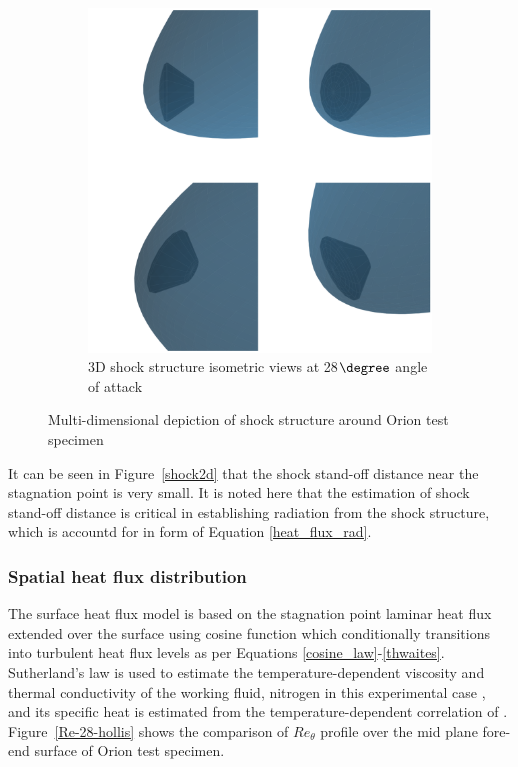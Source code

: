 \documentclass[%
 aip,
 amsmath,amssymb,
preprint,%
]{revtex4-1}
\begin{document}
\begin{figure}[h!]
\begin{subfigure}[b]{0.49\textwidth}
\includegraphics[width=\textwidth]{shock3D.png}
\caption{3D shock structure isometric views at 28$\degree$ angle of attack}
\label{shock3d}
\end{subfigure}
\caption{Multi-dimensional depiction of shock structure around Orion test specimen}
\end{figure}

It can be seen in Figure~\ref{shock2d} that the shock stand-off distance near the stagnation point is very small. %
It is noted here that the estimation of shock stand-off distance is critical in establishing radiation from the shock structure, which is accountd for in form of Equation \eqref{heat_flux_rad}.

\subsubsection{Spatial heat flux distribution}
The surface heat flux model is based on the stagnation point laminar heat flux extended over the surface using cosine function which conditionally transitions into turbulent heat flux levels as per Equations \eqref{cosine_law}-\eqref{thwaites}. Sutherland's law is used to estimate the temperature-dependent viscosity and thermal conductivity of the working fluid, nitrogen in this experimental case \citep{White_fluids}, and its specific heat is estimated from the temperature-dependent correlation of \cite{Chase_NIST}. Figure~\ref{Re-28-hollis} shows the comparison of $Re_{\theta}$ profile over the mid plane fore-end surface of Orion test specimen. 
\end{document}
